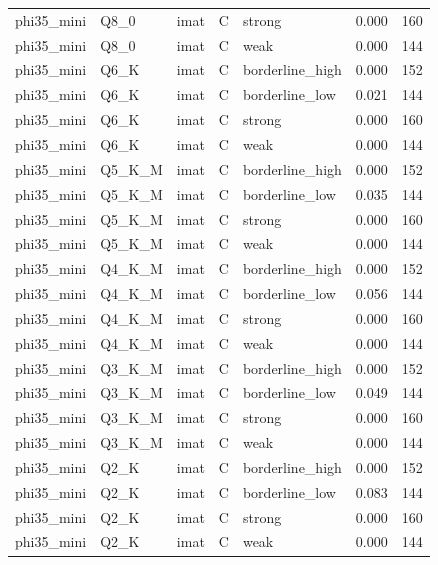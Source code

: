 \begin{tabular}{lllllrr}
phi35\_mini & Q8\_0 & imat & C & strong & 0.000 & 160 \\
phi35\_mini & Q8\_0 & imat & C & weak & 0.000 & 144 \\
phi35\_mini & Q6\_K & imat & C & borderline\_high & 0.000 & 152 \\
phi35\_mini & Q6\_K & imat & C & borderline\_low & 0.021 & 144 \\
phi35\_mini & Q6\_K & imat & C & strong & 0.000 & 160 \\
phi35\_mini & Q6\_K & imat & C & weak & 0.000 & 144 \\
phi35\_mini & Q5\_K\_M & imat & C & borderline\_high & 0.000 & 152 \\
phi35\_mini & Q5\_K\_M & imat & C & borderline\_low & 0.035 & 144 \\
phi35\_mini & Q5\_K\_M & imat & C & strong & 0.000 & 160 \\
phi35\_mini & Q5\_K\_M & imat & C & weak & 0.000 & 144 \\
phi35\_mini & Q4\_K\_M & imat & C & borderline\_high & 0.000 & 152 \\
phi35\_mini & Q4\_K\_M & imat & C & borderline\_low & 0.056 & 144 \\
phi35\_mini & Q4\_K\_M & imat & C & strong & 0.000 & 160 \\
phi35\_mini & Q4\_K\_M & imat & C & weak & 0.000 & 144 \\
phi35\_mini & Q3\_K\_M & imat & C & borderline\_high & 0.000 & 152 \\
phi35\_mini & Q3\_K\_M & imat & C & borderline\_low & 0.049 & 144 \\
phi35\_mini & Q3\_K\_M & imat & C & strong & 0.000 & 160 \\
phi35\_mini & Q3\_K\_M & imat & C & weak & 0.000 & 144 \\
phi35\_mini & Q2\_K & imat & C & borderline\_high & 0.000 & 152 \\
phi35\_mini & Q2\_K & imat & C & borderline\_low & 0.083 & 144 \\
phi35\_mini & Q2\_K & imat & C & strong & 0.000 & 160 \\
phi35\_mini & Q2\_K & imat & C & weak & 0.000 & 144 \\
\bottomrule
\end{tabular}
